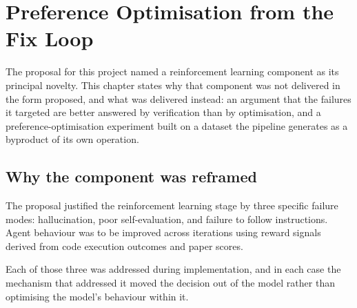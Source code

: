 \chapter{Preference Optimisation from the Fix Loop}
\label{ch:po}


The proposal for this project named a reinforcement learning component as its
principal novelty. This chapter states why that component was not delivered in
the form proposed, and what was delivered instead: an argument that the failures
it targeted are better answered by verification than by optimisation, and a
preference-optimisation experiment built on a dataset the pipeline generates as a
byproduct of its own operation.

\section{Why the component was reframed}
\label{sec:po-reframe}

The proposal justified the reinforcement learning stage by three specific
failure modes: hallucination, poor self-evaluation, and failure to follow
instructions. Agent behaviour was to be improved across iterations using reward
signals derived from code execution outcomes and paper scores.

Each of those three was addressed during implementation, and in each case the
mechanism that addressed it moved the decision out of the model rather than
optimising the model's behaviour within it.

